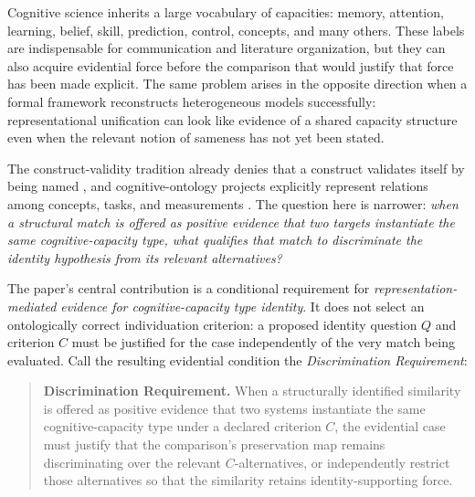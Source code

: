\documentclass[11pt]{article}
\begin{document}
Cognitive science inherits a large vocabulary of capacities: memory, attention, learning, belief, skill, prediction, control, concepts, and many others. These labels are indispensable for communication and literature organization, but they can also acquire evidential force before the comparison that would justify that force has been made explicit. The same problem arises in the opposite direction when a formal framework reconstructs heterogeneous models successfully: representational unification can look like evidence of a shared capacity structure even when the relevant notion of sameness has not yet been stated.

The construct-validity tradition already denies that a construct validates itself by being named \citep{CronbachMeehl1955ConstructValidity,BorsboomMellenberghVanHeerden2004Validity}, and cognitive-ontology projects explicitly represent relations among concepts, tasks, and measurements \citep{PoldrackEtAl2011CognitiveAtlas,TurnerLaird2012CogPO,PoldrackYarkoni2016CognitiveOntologies}. The question here is narrower: \emph{when a structural match is offered as positive evidence that two targets instantiate the same cognitive-capacity type, what qualifies that match to discriminate the identity hypothesis from its relevant alternatives?}

The paper's central contribution is a conditional requirement for \emph{representation-mediated evidence for cognitive-capacity type identity}. It does not select an ontologically correct individuation criterion: a proposed identity question \(Q\) and criterion \(C\) must be justified for the case independently of the very match being evaluated. Call the resulting evidential condition the \emph{Discrimination Requirement}:

\begin{quote}
\textbf{Discrimination Requirement.} When a structurally identified similarity is offered as positive evidence that two systems instantiate the same cognitive-capacity type under a declared criterion \(C\), the evidential case must justify that the comparison's preservation map remains discriminating over the relevant \(C\)-alternatives, or independently restrict those alternatives so that the similarity retains identity-supporting force.
\end{quote}
\end{document}
